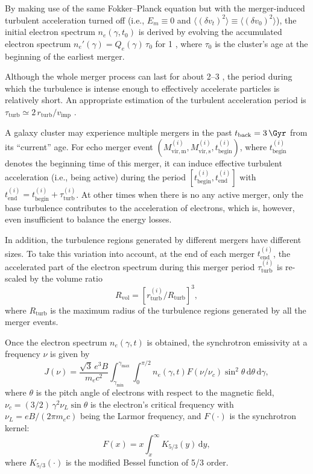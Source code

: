 \documentclass[twocolumn]{aastex62}
\newcommand{\R}[1]{\mathrm{#1}}
\newcommand{\D}[1]{\R{d} #1}
\newcommand{\editone}[1]{{\leavevmode\color{cyan}#1}}
\begin{document}
\editone{%
By making use of the same Fokker--Planck equation but with the
merger-induced turbulent acceleration turned off (i.e., $E_m \equiv 0$ and
$\langle (\delta v_t)^2 \rangle \equiv \langle (\delta v_0)^2 \rangle$),}  %
the initial electron spectrum $n_e(\gamma, t_0)$ is derived by evolving the
accumulated electron spectrum $n_e'(\gamma) = Q_e(\gamma) \,\tau_0$ for
\SI{1}{\Gyr} \citep[e.g.,][]{brunetti2007}, where $\tau_0$ is the cluster's
age at the beginning of the earliest merger.

Although the whole merger process can last for about \SIrange{2}{3}{\Gyr}
\citep[e.g.,][]{tormen2004,cassano2016}, the period during which the
turbulence is intense enough to effectively accelerate particles is
relatively short.
An appropriate estimation of the turbulent acceleration period is
$\tau_{\R{turb}} \simeq 2 \,r_{\R{turb}} / v_{\R{imp}}$ \citep{miniati2015}.
\editone{%
A galaxy cluster may experience multiple mergers in the past
$t_{\R{back}} = \SI{3}{\Gyr}$ from its \enquote{current} age.
For echo merger event
$\left( M^{(i)}_{\R{vir,m}}, M^{(i)}_{\R{vir,s}}, t^{(i)}_{\R{begin}} \right)$,
where $t^{(i)}_{\R{begin}}$ denotes the beginning time of this merger,
it can induce effective turbulent acceleration (i.e., being active) during
the period $\left[ t^{(i)}_{\R{begin}}, t^{(i)}_{\R{end}} \right]$ with
$t^{(i)}_{\R{end}} = t^{(i)}_{\R{begin}}+\tau^{(i)}_{\R{turb}}$.
At other times when there is no any active merger, only the base
turbulence contributes to the acceleration of electrons, which is, however,
even insufficient to balance the energy losses.

In addition, the turbulence regions generated by different mergers have
different sizes.
To take this variation into account, at the end of each merger
$t^{(i)}_{\R{end}}$, the accelerated part of the electron spectrum during
this merger period $\tau^{(i)}_{\R{turb}}$ is re-scaled by the volume ratio
\begin{equation}
  \label{eq:ratio-v}
  R_{\R{vol}} = \left[ r^{(i)}_{\R{turb}} / R_{\R{turb}} \right]^3 ,
\end{equation}
where $R_{\R{turb}}$ is the maximum radius of the turbulence regions
generated by all the merger events.
} %

Once the electron spectrum $n_e(\gamma, t)$ is obtained, the synchrotron
emissivity at a frequency $\nu$ is given by \citep{rybicki1979}
\begin{equation}
  \label{sec:jnu-sync}
  J(\nu) = \frac{\sqrt{3} \, e^3 B}{m_e c^2}
    \!\int_{\gamma_{\R{min}}}^{\gamma_{\R{max}}} \!\!\!\int_0^{\pi/2}\!
    n_e(\gamma, t) F(\nu/\nu_c) \sin^2 \!\theta \,\D{\theta} \,\D{\gamma},
\end{equation}
where
$\theta$ is the pitch angle of electrons with respect to the magnetic
field, $\nu_c = (3/2) \,\gamma^2 \nu_L \sin\theta$ is the electron's
critical frequency with $\nu_L = e B / (2\pi m_e c)$ being the Larmor
frequency, and $F(\cdot)$ is the synchrotron kernel:
\begin{equation}
  \label{eq:sync-kernel}
  F(x) = x \int_x^{\infty} K_{5/3}(y) \,\D{y} ,
\end{equation}
where $K_{5/3}(\cdot)$ is the modified Bessel function of 5/3 order.
\end{document}
